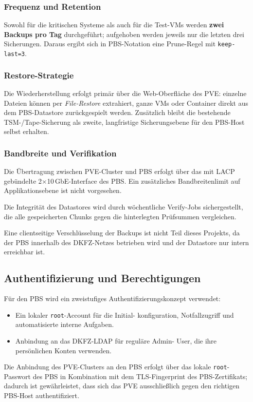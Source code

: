 \subsubsection*{Frequenz und Retention}
Sowohl für die kritischen Systeme als auch für die Test-\acp{VM}
werden \textbf{zwei Backups pro Tag} durchgeführt; aufgehoben
werden jeweils nur die letzten drei Sicherungen.
Daraus ergibt sich in \ac{PBS}-Notation eine Prune-Regel mit
\texttt{keep-last=3}.

\subsubsection*{Restore-Strategie}
Die Wiederherstellung erfolgt primär über die Web-Oberfläche des
\ac{PVE}: einzelne Dateien können per \emph{File-Restore} extrahiert,
ganze \acp{VM} oder Container direkt aus dem \ac{PBS}-Datastore
zurückgespielt werden. Zusätzlich bleibt die bestehende
\ac{TSM}-/Tape-Sicherung als zweite, langfristige Sicherungsebene
für den \ac{PBS}-Host selbst erhalten.

\subsubsection*{Bandbreite und Verifikation}
Die Übertragung zwischen \ac{PVE}-Cluster und \ac{PBS} erfolgt über
das mit \ac{LACP} gebündelte 2$\times$10\,GbE-Interface des \ac{PBS}.
Ein zusätzliches Bandbreitenlimit auf Applikationsebene ist nicht
vorgesehen.

Die Integrität des Datastores wird durch wöchentliche Verify-Jobs
sichergestellt, die alle gespeicherten Chunks gegen die hinterlegten
Prüfsummen vergleichen.

Eine clientseitige Verschlüsselung der Backups ist nicht Teil dieses
Projekts, da der \ac{PBS} innerhalb des \ac{DKFZ}-Netzes betrieben
wird und der Datastore nur intern erreichbar ist.


\subsection{Authentifizierung und Berechtigungen}
\label{sec:AuthZ}
Für den \ac{PBS} wird ein zweistufiges Authentifizierungskonzept
verwendet:
\begin{itemize}
    \item Ein lokaler \texttt{root}-Account für die Initial-
          konfiguration, Notfallzugriff und automatisierte interne
          Aufgaben.
    \item Anbindung an das \ac{DKFZ}-\ac{LDAP} für reguläre Admin-
          User, die ihre persönlichen Konten verwenden.
\end{itemize}
Die Anbindung des \ac{PVE}-Clusters an den \ac{PBS} erfolgt über das
lokale \texttt{root}-Passwort des \ac{PBS} in Kombination mit dem
TLS-Fingerprint des \ac{PBS}-Zertifikats; dadurch ist gewährleistet,
dass sich das \ac{PVE} ausschließlich gegen den richtigen
\ac{PBS}-Host authentifiziert.


